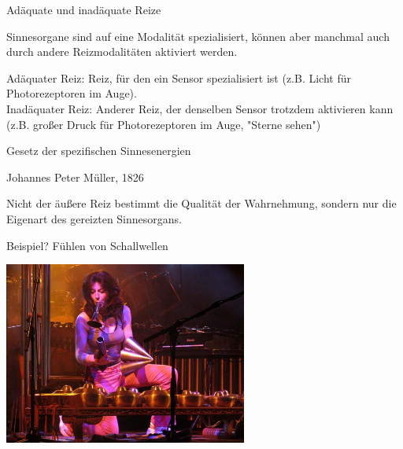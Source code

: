 \documentclass[aspectratio=169]{beamer}
\begin{document}
\begin{frame}{Adäquate und inadäquate Reize}

Sinnesorgane sind auf eine Modalität spezialisiert, können aber manchmal auch durch andere Reizmodalitäten aktiviert werden. \\[0.5 cm]

\pause


Adäquater Reiz: Reiz, für den ein Sensor spezialisiert ist (z.B. Licht für Photorezeptoren im Auge).  \\[0.2 cm]

Inadäquater Reiz: Anderer Reiz, der denselben Sensor trotzdem aktivieren kann (z.B. großer Druck für Photorezeptoren im Auge, "Sterne sehen") \\ [0.2]


\end{frame}




\begin{frame}{Gesetz der spezifischen Sinnesenergien}


\begin{block}{Johannes Peter Müller, 1826}

Nicht der äußere Reiz bestimmt die Qualität der Wahrnehmung, sondern nur die Eigenart des gereizten Sinnesorgans.

\end{block}


\pause 
Beispiel? \pause Fühlen von Schallwellen
    
    
\begin{center}
    \includegraphics[width=0.6\textwidth]{evelyn_glennie.jpg}
\end{center}


    
\end{frame}
\end{document}
